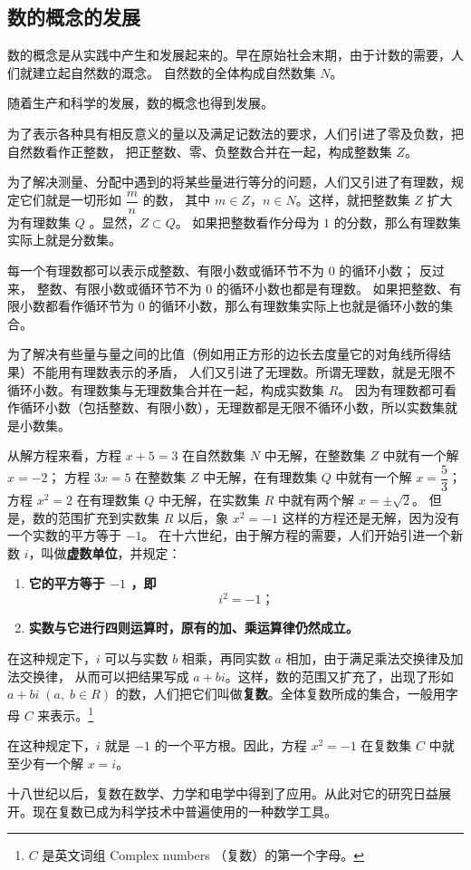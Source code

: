 \subsection{数的概念的发展}\label{subsec:5-1}

数的概念是从实践中产生和发展起来的。早在原始社会末期，由于计数的需要，人们就建立起自然数的溉念。
自然数的全体构成自然数集 $N$。

随着生产和科学的发展，数的概念也得到发展。

为了表示各种具有相反意义的量以及满足记数法的要求，人们引进了零及负数，把自然数看作正整数，
把正整数、零、负整数合并在一起，构成整数集 $Z$。

为了解决测量、分配中遇到的将某些量进行等分的问题，人们又引进了有理数，规定它们就是一切形如 $\dfrac{m}{n}$ 的数，
其中 $m \in Z$，$n \in N$。这样，就把整数集 $Z$ 扩大为有理数集 $Q$ 。显然，$Z \subset Q$。
如果把整数看作分母为 $1$ 的分数，那么有理数集实际上就是分数集。

每一个有理数都可以表示成整数、有限小数或循环节不为 $0$ 的循环小数；
反过来， 整数、有限小数或循环节不为 $0$ 的循环小数也都是有理数。
如果把整数、有限小数都看作循环节为 $0$ 的循环小数，那么有理数集实际上也就是循环小数的集合。

为了解决有些量与量之间的比值（例如用正方形的边长去度量它的对角线所得结果）不能用有理数表示的矛盾，
人们又引进了无理数。所谓无理数，就是无限不循环小数。有理数集与无理数集合并在一起，构成实数集 $R$。
因为有理数都可看作循环小数（包括整数、有限小数），无理数都是无限不循环小数，所以实数集就是小数集。

从解方程来看，方程 $x + 5 = 3$ 在自然数集 $N$ 中无解，在整数集 $Z$ 中就有一个解 $x = -2$；
方程 $3x = 5$ 在整数集 $Z$ 中无解，在有理数集 $Q$ 中就有一个解 $x = \dfrac{5}{3}$；
方程 $x^2 = 2$ 在有理数集 $Q$ 中无解，在实数集 $R$ 中就有两个解 $x = \pm\sqrt{2}$。
但是，数的范围扩充到实数集 $R$ 以后，象 $x^2 = -1$ 这样的方程还是无解，因为没有一个实数的平方等于 $-1$。
在十六世纪，由于解方程的需要，人们开始引进一个新数 $i$，叫做\textbf{虚数单位}，并规定：

\begin{enumerate}[(1), nosep, left=\parindent]
    \item \textbf{它的平方等于 $-1$ ，即 $$i^2 = -1 \text{；}$$}
    \item \textbf{实数与它进行四则运算时，原有的加、乘运算律仍然成立。}
\end{enumerate}

在这种规定下，$i$ 可以与实数 $b$ 相乘，再同实数 $a$ 相加，由于满足乘法交换律及加法交换律，
从而可以把结果写成 $a + bi$。这样，数的范围又扩充了，出现了形如 $a + bi \; (a,\; b \in R)$
的数，人们把它们叫做\textbf{复数}。全体复数所成的集合，一般用字母 $C$ 来表示。\footnote{$C$ 是英文词组 Complex numbers （复数）的第一个字母。}

在这种规定下，$i$ 就是 $-1$ 的一个平方根。因此，方程 $x^2 = -1$ 在复数集 $C$ 中就至少有一个解 $x = i$。

十八世纪以后，复数在数学、力学和电学中得到了应用。从此对它的研究日益展开。现在复数已成为科学技术中普遍使用的一种数学工具。

